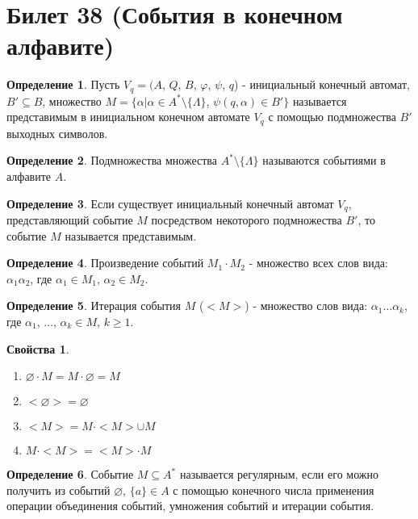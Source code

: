 \documentclass[a4paper, 12pt]{article}
\renewcommand{\phi}{\varphi}
\theoremstyle{definition}
\newtheorem*{definition}{Определение}
\theoremstyle{plain}
\newtheorem*{properties}{Свойства}
\theoremstyle{remark}
\begin{document}
  \section{Билет 38 (События в конечном алфавите)}
  \begin{definition}
    Пусть $V_q=(A$, $Q$, $B$, $\phi$, $\psi$, $q$) - инициальный конечный автомат, $B'\subseteq B$, множество $M=\{\alpha|\alpha\in A^*\setminus\{\Lambda\}$, $\psi(q,\alpha)\in B'\}$ называется представимым в инициальном конечном автомате $V_q$ с помощью подмножества $B'$ выходных символов.
  \end{definition}
  \begin{definition}
    Подмножества множества $A^*\setminus\{\Lambda\}$ называются событиями в алфавите $A$.
  \end{definition}
  \begin{definition}
    Если существует инициальный конечный автомат $V_q$, представляющий событие $M$ посредством некоторого подмножества $B'$, то событие $M$ называется представимым.
  \end{definition}
  \begin{definition}
    Произведение событий $M_1\cdot M_2$ - множество всех слов вида: $\alpha_1\alpha_2$, где $\alpha_1\in M_1$, $\alpha_2\in M_2$.
  \end{definition}
  \begin{definition}
    Итерация события $M$ ($<M>$) - множество слов вида: $\alpha_1\ldots\alpha_k$, где $\alpha_1$, $\ldots$, $\alpha_k\in M$, $k\geqslant1$.
  \end{definition}
  \begin{properties}
    \begin{enumerate}
      \item $\varnothing\cdot M=M\cdot\varnothing=M$
      \item $<\varnothing>=\varnothing$
      \item $<M>=M\cdot<M>\cup M$
      \item $M\cdot<M>=<M>\cdot M$
    \end{enumerate}
  \end{properties}
  \begin{definition}
    Событие $M\subseteq A^*$ называется регулярным, если его можно получить из событий $\varnothing$, $\{a\}\in A$ с помощью конечного числа применения операции объединения событий, умножения событий и итерации события.
  \end{definition}
\end{document}
